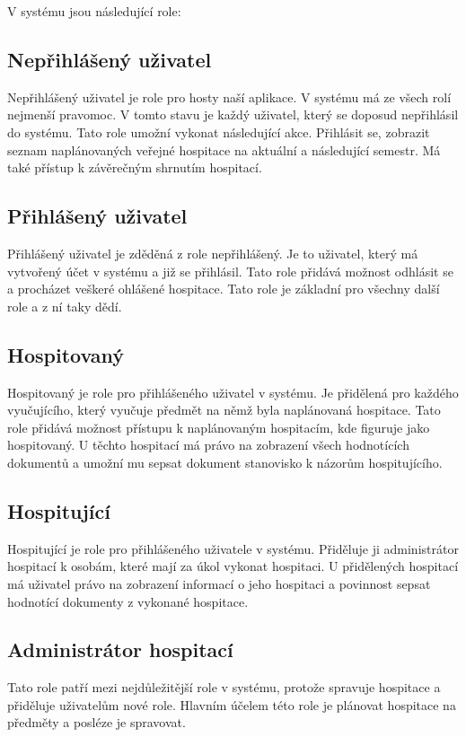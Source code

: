 V systému jsou následující role:

\subsection{Nepřihlášený uživatel}
Nepřihlášený uživatel je role pro hosty naší aplikace. V systému má ze všech rolí nejmenší pravomoc. V tomto stavu je každý uživatel, který se doposud nepřihlásil do systému. Tato role umožní vykonat následující akce. Přihlásit se, zobrazit seznam naplánovaných veřejné hospitace na aktuální a následující semestr. Má také přístup k závěrečným shrnutím hospitací.

\subsection{Přihlášený uživatel}
Přihlášený uživatel je zděděná z role nepřihlášený. Je to uživatel, který má vytvořený účet v systému a již se přihlásil. Tato role přidává možnost odhlásit se a procházet veškeré ohlášené hospitace. Tato role je základní pro všechny další role a z ní taky dědí.

\subsection{Hospitovaný}
Hospitovaný je role pro přihlášeného uživatel v systému. Je přidělená pro každého vyučujícího, který vyučuje předmět na němž byla naplánovaná hospitace. Tato role přidává možnost přístupu k naplánovaným hospitacím, kde figuruje jako hospitovaný. U těchto hospitací má právo na zobrazení všech hodnotících dokumentů a umožní mu sepsat dokument stanovisko k názorům hospitujícího.

\subsection{Hospitující}
Hospitující je role pro přihlášeného uživatele v systému. Přiděluje ji administrátor hospitací k osobám, které mají za úkol vykonat hospitaci. U přidělených hospitací má uživatel právo na zobrazení informací o jeho hospitaci a povinnost sepsat hodnotící dokumenty z vykonané hospitace.

\subsection{Administrátor hospitací}
Tato role patří mezi nejdůležitější role v systému, protože spravuje hospitace a přiděluje uživatelům nové role. Hlavním účelem této role je plánovat hospitace na předměty a posléze je spravovat.   

